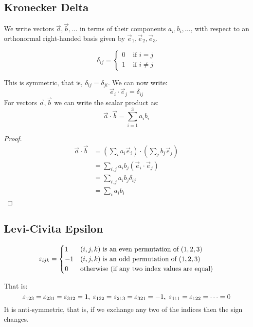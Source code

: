 \documentclass[../main.tex]{subfiles}
\begin{document}
\subsection{Kronecker Delta}
We write vectors $\vec{a}, \vec{b}, \ldots$ in terms of their components $a_i, b_i, \ldots$, with respect to an orthonormal right-handed basis given by $\vec{e}_1, \vec{e}_2, \vec{e}_3$.
\begin{definition}
  \[
    \delta_{i j} = \begin{cases}
    0 & \text{ if } i = j \\
    1 & \text{ if } i \neq j
    \end{cases}
  \]
\end{definition}
This is symmetric, that is, $\delta_{i j} = \delta_{j i}$.
We can now write:
\[
  \vec{e}_i \cdot \vec{e}_j = \delta_{i j}
\]
For vectors $\vec{a}, \vec{b}$ we can write the scalar product as:
\[
  \vec{a} \cdot \vec{b} = \sum_{i=1}^{3} a_i b_i
\]
\begin{proof}
  \begin{align*}
    \vec{a} \cdot \vec{b} &= \left(\sum_i a_i \vec{e}_i\right) \cdot \left(\sum_j b_j \vec{e}_j\right) \\
                          &= \sum_{i,j} a_i b_j (\vec{e}_i \cdot \vec{e}_j) \\
                          &= \sum_{i,j} a_i b_j \delta_{i j} \\
                          &= \sum_i a_i b_i
  \end{align*}
\end{proof}
\subsection{Levi-Civita Epsilon}
\begin{definition}
  \[
    \varepsilon_{i j k} = \begin{cases}
    1 & (i,j,k) \text{ is an even permutation of }(1, 2, 3) \\
    -1 & (i, j, k) \text{ is an odd permutation of }(1, 2, 3) \\
    0 & \text{otherwise (if any two index values are equal)}
    \end{cases}
  \]
\end{definition}
That is:
\[
 \varepsilon_{123} = \varepsilon_{231} = \varepsilon_{312} = 1,\; \varepsilon_{132} = \varepsilon_{213} = \varepsilon_{321} = -1,\; \varepsilon_{111} = \varepsilon_{122} = \cdots = 0
\]
It is anti-symmetric, that is, if we exchange any two of the indices then the sign changes.
\end{document}
